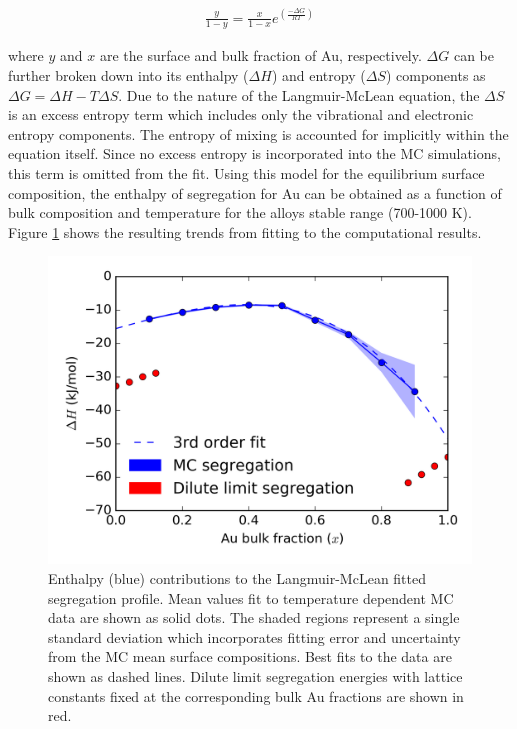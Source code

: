 \documentclass[12pt,oneside]{cmuthesis}
\begin{document}
\begin{eqnarray} \label{eq-gibbs}
\frac{y}{1 - y} = \frac{x}{1 - x}e^{\left(\frac{-\Delta G}{RT}\right)}
\end{eqnarray}

\noindent where \(y\) and \(x\) are the surface and bulk fraction of Au, respectively. \(\Delta G\) can be further broken down into its enthalpy (\(\Delta H\)) and entropy (\(\Delta S\)) components as \(\Delta G = \Delta H - T \Delta S\). Due to the nature of the Langmuir-McLean equation, the \(\Delta S\) is an excess entropy term which includes only the vibrational and electronic entropy components. The entropy of mixing is accounted for implicitly within the equation itself. Since no excess entropy is incorporated into the MC simulations, this term is omitted from the fit. Using this model for the equilibrium surface composition, the enthalpy of segregation for Au can be obtained as a function of bulk composition and temperature for the alloys stable range (700-1000 K). Figure \ref{fig-temp-langmuir-mclean} shows the resulting trends from fitting to the computational results.

\begin{figure}[h]
\centering
\includegraphics[width=5.5in]{./images/temp-langmuir-mclean.png}
\caption{\label{fig-temp-langmuir-mclean}
Enthalpy (blue) contributions to the Langmuir-McLean fitted segregation profile. Mean values fit to temperature dependent MC data are shown as solid dots. The shaded regions represent a single standard deviation which incorporates fitting error and uncertainty from the MC mean surface compositions. Best fits to the data are shown as dashed lines. Dilute limit segregation energies with lattice constants fixed at the corresponding bulk Au fractions are shown in red.}
\end{figure}
\end{document}
